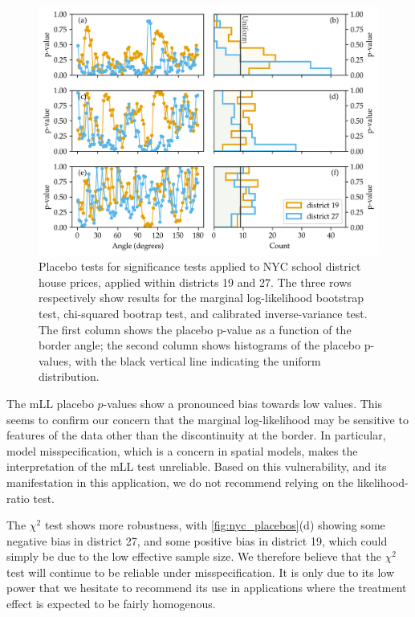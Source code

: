 \documentclass[letter,12pt]{article}
\begin{document}
\begin{figure}[tbp]
    \centering
    \includegraphics[width=\textwidth]{../NYC/NYC_plots/NYC_placebos.png}
    \caption{\label{fig:nyc_placebos} Placebo tests for significance tests applied to NYC school district house prices, applied within districts 19 and 27. The three rows respectively show results for the marginal log-likelihood bootstrap test, chi-squared bootrap test, and calibrated inverse-variance test. The first column shows the placebo p-value as a function of the border angle; the second column shows histograms of the placebo p-values, with the black vertical line indicating the uniform distribution.}
\end{figure}

The mLL placebo \(p\)-values show a pronounced bias towards low values.
This seems to confirm our concern that the marginal log-likelihood may be sensitive to features of the data other than the discontinuity at the border.
In particular, model misspecification, which is a concern in spatial models, makes the interpretation of the mLL test unreliable.
Based on this vulnerability, and its manifestation in this application, we do not recommend relying on the likelihood-ratio test.

The \(\chi^2\) test shows more robustness, with \autoref{fig:nyc_placebos}(d) showing some negative bias in district 27, and some positive bias in district 19, which could simply be due to the low effective sample size.
We therefore believe that the \(\chi^2\) test will continue to be reliable under misspecification.
It is only due to its low power that we hesitate to recommend its use in applications where the treatment effect is expected to be fairly homogenous.
\end{document}
